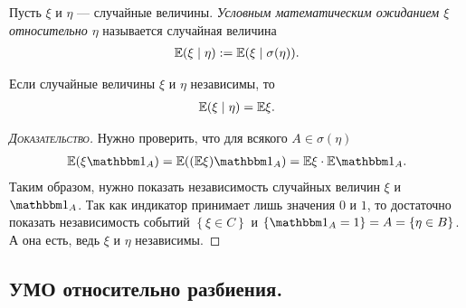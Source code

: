 \documentclass[../main.tex]{subfiles}
\begin{document}
 \begin{df}
  Пусть $ \xi $ и $ \eta $ --- случайные величины. \textit{Условным математическим ожиданием $ \xi $ относительно $ \eta $} называется случайная величина
  \begin{align*}
   \mathbb E(\xi \mid \eta) := \mathbb E (\xi \mid \sigma(\eta)).
  \end{align*} 
 \end{df}
 \begin{thm}
  Если случайные величины $ \xi $ и $ \eta $ независимы, то
  \begin{align*}
   \mathbb E(\xi \mid \eta) = \mathbb E\xi.
  \end{align*}
 \end{thm}
 \begin{proof}[\normalfont\textsc{Доказательство}]
  Нужно проверить, что для всякого $ A \in \sigma(\eta) $
  \begin{align*}
   \E(\xi\Ind_A) = \E((\E\xi)\Ind_A) = \E\xi \cdot \E \Ind_A.
  \end{align*} Таким образом, нужно показать независимость случайных величин $ \xi $  и $ \Ind_A $. Так как индикатор принимает лишь значения $ 0 $ и $ 1 $, то достаточно показать независимость событий $ \left\{ \xi \in C \right\} $ и $ \left\{ \Ind_A = 1 \right\} = A  = \left\{ \eta \in B \right\}$. А она есть, ведь $ \xi $ и $ \eta $ независимы.
 \end{proof}

 \subsection{УМО относительно разбиения.}
\end{document}
